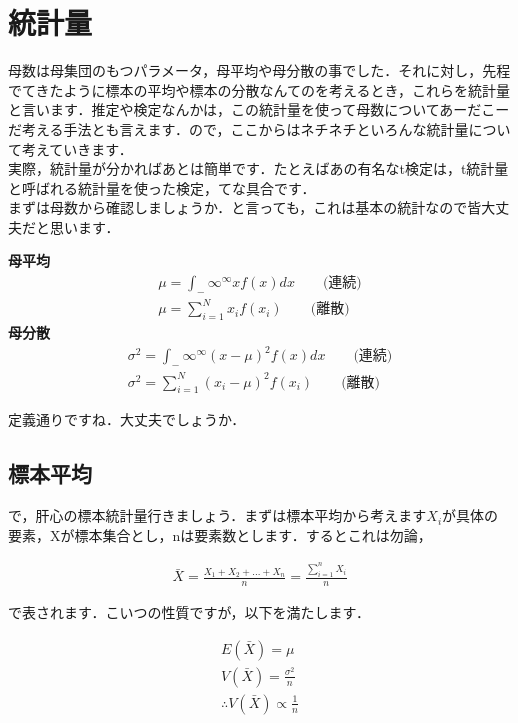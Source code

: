 \documentclass[11pt,a4paper,uplatex]{ujreport} 	%
\begin{document}
\section{統計量}
母数は母集団のもつパラメータ，母平均や母分散の事でした．それに対し，先程でてきたように標本の平均や標本の分散なんてのを考えるとき，これらを統計量と言います．推定や検定なんかは，この統計量を使って母数についてあーだこーだ考える手法とも言えます．ので，ここからはネチネチといろんな統計量について考えていきます．\\

実際，統計量が分かればあとは簡単です．たとえばあの有名なt検定は，t統計量と呼ばれる統計量を使った検定，てな具合です．\\

まずは母数から確認しましょうか．と言っても，これは基本の統計なので皆大丈夫だと思います．

\begin{screen}
  \textbf{母平均}
  \begin{align}
    \mu = \int_-\infty^\infty x f(x) dx \qquad \text{(連続)}\\
    \mu = \sum_{i=1}^N x_i f(x_i) \qquad \text{(離散)}
  \end{align}  
  \textbf{母分散}
  \begin{align}
    \sigma^2 = \int_-\infty^\infty (x-\mu)^2f(x)dx \qquad \text{(連続)}\\
    \sigma^2 = \sum_{i=1}^N (x_i-\mu)^2 f(x_i) \qquad \text{(離散)}
  \end{align}
\end{screen}

定義通りですね．大丈夫でしょうか．\\

\subsection{標本平均}
で，肝心の標本統計量行きましょう．まずは標本平均から考えます$X_i$が具体の要素，Xが標本集合とし，nは要素数とします．するとこれは勿論，

\begin{align}
  \bar{X} = \frac{X_1 + X_2+...+X_n}{n} = \frac{\sum_{i=1}^n X_i}{n}
\end{align}

で表されます．こいつの性質ですが，以下を満たします．

\begin{align}
  E(\bar{X}) = \mu
  \label{eq:ave}\\
  V(\bar{X}) = \frac{\sigma^2}{n}\\
  \therefore V(\bar{X}) \propto \frac{1}{n}
  \label{eq:var}
\end{align}
  
\end{document}
